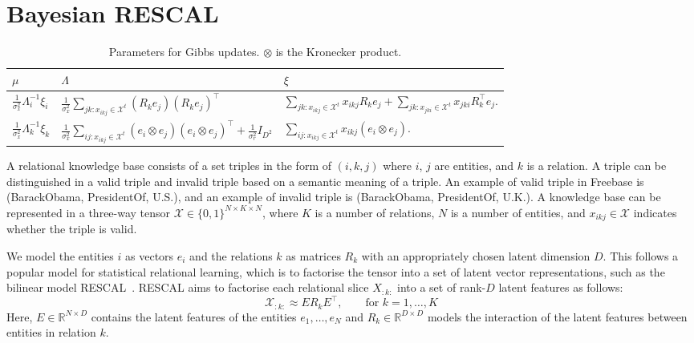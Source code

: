 \section{Bayesian RESCAL}
\label{sec:brescal}

\begin{table*}[bt]
\caption{Parameters for Gibbs updates. $\otimes$ is the Kronecker product.}
\label{tab:brescalposterior}
\vskip 0.05in
\begin{tabu}{l|l|l}
$\mu$&$\Lambda$&$\xi$\\
\hline
$\frac{1}{\sigma_x^2}\Lambda_i^{-1}\xi_i$&
$\frac{1}{\sigma_x^2} \sum_{jk : x_{ikj} \in \mathcal{X}^{t}} (R_k e_j)(R_k e_j)^\top$&
$\sum_{jk : x_{ikj} \in \mathcal{X}^{t}}  x_{ikj} R_{k} e_{j} +
\sum_{jk : x_{jki} \in \mathcal{X}^{t}} x_{jki} R_{k}^\top e_{j}.$
\\
$\frac{1}{\sigma_x^2}\Lambda_k^{-1}\xi_k$&
$\frac{1}{\sigma_x^2} \sum_{ij:x_{ikj} \in \mathcal{X}^{t}} (e_i
\otimes e_j)(e_i \otimes e_j)^\top + \frac{1}{\sigma_r^2} {I}_{D^2}$&
$\sum_{ij:x_{ikj} \in \mathcal{X}^{t}} x_{ikj} (e_{i} \otimes e_{j}).$
\end{tabu}
\end{table*}


A relational knowledge base consists of a set triples in the form of $(i, k, j)$
where $i$, $j$ are entities, and $k$ is a relation. A triple can be distinguished
in a valid triple and invalid triple based on a semantic meaning of a triple. An
example of valid triple in Freebase is (BarackObama, PresidentOf, U.S.), and an
example of invalid triple is (BarackObama, PresidentOf, U.K.).
A knowledge base can be represented in a three-way tensor
$\mathcal{X} \in \{0, 1\}^{N \times K \times N}$, where $K$ is a number of
relations, $N$ is a number of entities, and $x_{ikj}\in\mathcal{X}$ indicates whether
the triple is valid.

We model the entities $i$ as vectors $e_i$ and the relations $k$ as matrices $R_k$ with an
appropriately chosen latent dimension $D$. This follows a popular model
for statistical relational learning, which is to factorise the tensor into a
set of latent vector representations, such as the bilinear model RESCAL~\cite{nickel2011three}.
RESCAL aims to factorise each relational slice $X_{:k:}$ into a set of rank-$D$ latent
features as follows:
\[
  \mathcal{X}_{:k:} \approx E R_k E^\top, \qquad \text{for } k = 1, \dots, K
\]
Here, $E\in {\mathbb R}^{N \times D}$ contains the latent features of the
entities $e_1, \ldots, e_N$ and $R_k\in {\mathbb R}^{D \times D}$ models the interaction of the
latent features between entities in relation $k$.


